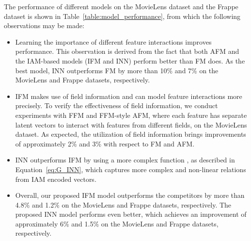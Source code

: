 \documentclass[letterpaper]{article} \usepackage{aaai19}  \usepackage{times}  \usepackage{helvet}  \usepackage{courier}  \usepackage{url}  \usepackage{graphicx}  \frenchspacing  \setlength{\pdfpagewidth}{8.5in}  \setlength{\pdfpageheight}{11in}  \usepackage{mathtools}
\begin{document}
The performance of different models on the MovieLens dataset and the Frappe dataset is shown in Table~\ref{table:model_performance}, from which the following observations may be made:
\begin{itemize}
\item Learning the importance of different feature interactions improves performance. This observation is derived from the fact that both AFM and the IAM-based models (IFM and INN) perform better than FM does. As the best model, INN outperforms FM by more than 10\% and 7\% on the MovieLens and Frappe datasets, respectively.
\item IFM makes use of field information and can model feature interactions more precisely. To verify the effectiveness of field information, we conduct experiments with FFM and FFM-style AFM, where each feature has separate latent vectors to interact with features from different fields, on the MovieLens dataset. As expected, the utilization of field information brings improvements of approximately 2\% and 3\% with respect to FM and AFM. 
\item INN outperforms IFM by using a more complex function , as described in Equation~\ref{eq:G_INN}, which captures more complex and non-linear relations from IAM encoded vectors. 
\item Overall, our proposed IFM model outperforms the competitors by more than 4.8\% and 1.2\% on the MovieLens and Frappe datasets, respectively. The proposed INN model performs even better, which achieves an improvement of approximately 6\% and 1.5\% on the MovieLens and Frappe datasets, respectively.
\end{itemize}
\end{document}
